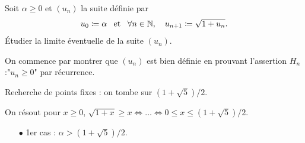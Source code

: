 \documentclass{magnolia}
\begin{document}
\begin{exos}
\exo Soit $\alpha\geq 0$ et $(u_n)$ la suite définie par
  \[u_0\coloneqq\alpha \quad\!\text{et}\quad\! \forall n\in\mathbb{N} ,\quad u_{n+1}\coloneqq\sqrt{1+u_n}.\]
  Étudier la limite éventuelle de la suite $(u_n)$.
\begin{center}
\end{center}
\begin{sol}
On commence par montrer que $(u_n)$ est bien définie en prouvant l'assertion $H_n$:"$u_n\geq 0$" par récurrence.

Recherche de points fixes : on tombe sur $(1+\sqrt{5})/2$.

On résout pour $x\geq 0$, $\sqrt{1+x}\geq x \Longleftrightarrow \ldots \Longleftrightarrow 0\leq x \leq (1+\sqrt{5})/2$.

\begin{itemize}
\item[$\bullet$] 1er cas : $\alpha> (1+\sqrt{5})/2$.


\end{itemize}
\end{sol}
\end{exos}
\end{document}
